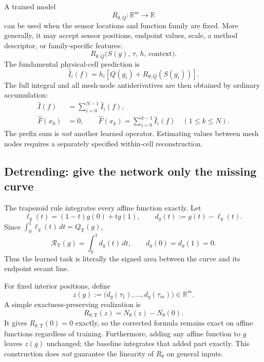 A trained model
\[
    R_{\theta,Q}:\mathbb R^m\longrightarrow\mathbb R
\]
can be used when the sensor locations and function family are fixed. More
generally, it may accept sensor positions, endpoint values, scale, a method
descriptor, or family-specific features:
\[
    R_{\theta,Q}\bigl(S(g),\,\tau,\,h,\,\mathrm{context}\bigr).
\]
The fundamental physical-cell prediction is
\begin{equation}
    \boxed{
        \widehat I_i(f)
        =h_i\left[Q(g_i)+R_{\theta,Q}(S(g_i))\right].
    }
    \label{eq:resop-local-prediction}
\end{equation}
The full integral and all mesh-node antiderivatives are then obtained by
ordinary accumulation:
\begin{align}
    \widehat I(f)   & =\sum_{i=0}^{N-1}\widehat I_i(f), \\
    \widehat F(x_0) & =0,\qquad
    \widehat F(x_k)=\sum_{i=0}^{k-1}\widehat I_i(f)
    \quad (1\leq k\leq N).
    \label{eq:resop-prefix}
\end{align}
The prefix sum is \emph{not} another learned operator. Estimating values
between mesh nodes requires a separately specified within-cell reconstruction.

\subsection{Detrending: give the network only the missing curve}

The trapezoid rule integrates every affine function exactly. Let
\begin{equation}
    \ell_g(t)=(1-t)g(0)+tg(1),
    \qquad d_g(t):=g(t)-\ell_g(t).
    \label{eq:resop-detrend}
\end{equation}
Since $\int_0^1\ell_g(t)\,dt=Q_{\mathrm T}(g)$,
\begin{equation}
    \boxed{
        \mathcal R_{\mathrm T}(g)=\int_0^1d_g(t)\,dt,
        \qquad d_g(0)=d_g(1)=0.
    }
    \label{eq:resop-detrended-residual}
\end{equation}
Thus the learned task is literally the signed area between the curve and
its endpoint secant line.

For fixed interior positions, define
\[
    z(g):=\bigl(d_g(\tau_1),\ldots,d_g(\tau_m)\bigr)\in\mathbb R^m.
\]
A simple exactness-preserving realization is
\begin{equation}
    R_{\theta,\mathrm T}(z)=N_\theta(z)-N_\theta(0).
    \label{eq:resop-zero-constraint}
\end{equation}
It gives $R_{\theta,\mathrm T}(0)=0$ exactly, so the corrected formula
remains exact on affine functions regardless of training. Furthermore,
adding any affine function to $g$ leaves $z(g)$ unchanged; the baseline
integrates that added part exactly. This construction does \emph{not}
guarantee the linearity of $R_\theta$ on general inputs.

